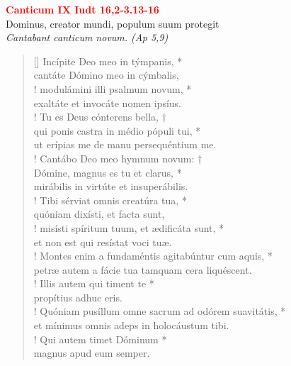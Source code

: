 


\def\greinitialformat#1{%
{\fontsize{39}{39}\selectfont #1}%
}




\vspace{0.3cm}
\begin{center}
 \textcolor{red}{\large \bf Canticum IX Iudt 16,2-3.13-16}\\
Dominus, creator mundi, populum suum protegit\\
\textit{\small Cantabant canticum novum. (Ap 5,9)}
\end{center}
\begin{verse}[\versewidth]
Incípite Deo meo in týmpanis, *\\
cantáte Dómino meo in cýmbalis,\\!
\vin modulámini illi psalmum novum, *\\
\vin exaltáte et invocáte nomen ipsíus.\\!
Tu es Deus cónterens bella, †\\
qui ponis castra in médio pópuli tui, *\\
ut erípias me de manu persequéntium me.\\!
\vin Cantábo Deo meo hymnum novum: †\\
\vin Dómine, magnus es tu et clarus, *\\
\vin mirábilis in virtúte et insuperábilis.\\!
Tibi sérviat omnis creatúra tua, *\\
quóniam dixísti, et facta sunt,\\!
\vin misísti spíritum tuum, et ædificáta sunt, *\\
\vin et non est qui resístat voci tuæ.\\!
Montes enim a fundaméntis agitabúntur cum aquis, *\\
petræ autem a fácie tua tamquam cera liquéscent.\\!
\vin Illis autem qui timent te *\\
\vin propítius adhuc eris.\\!
Quóniam pusíllum omne sacrum ad odórem suavitátis, *\\
et mínimus omnis adeps in holocáustum tibi.\\!
\vin Qui autem timet Dóminum *\\
\vin magnus apud eum semper.\\
\end{verse}
\vspace{1cm}



